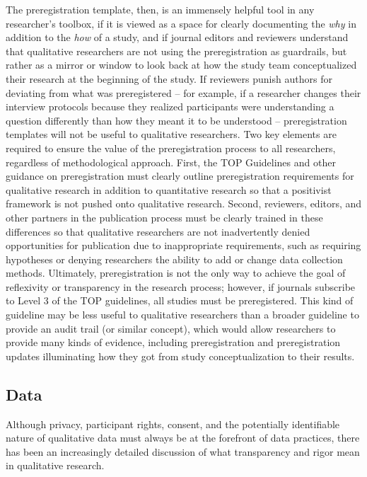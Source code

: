 \documentclass[authordate, meta]{jote-new-article}
\begin{document}
The preregistration template, then, is an immensely helpful tool in any researcher’s toolbox, if it is viewed as a space for clearly documenting the \emph{why }in addition to the \emph{how} of a study, and if journal editors and reviewers understand that qualitative researchers are not using the preregistration as guardrails, but rather as a mirror or window to look back at how the study team conceptualized their research at the beginning of the study. If reviewers punish authors for deviating from what was preregistered – for example, if a researcher changes their interview protocols because they realized participants were understanding a question differently than how they meant it to be understood – preregistration templates will not be useful to qualitative researchers. Two key elements are required to ensure the value of the preregistration process to all researchers, regardless of methodological approach. First, the TOP Guidelines and other guidance on preregistration must clearly outline preregistration requirements for qualitative research in addition to quantitative research so that a positivist framework is not pushed onto qualitative research. Second, reviewers, editors, and other partners in the publication process must be clearly trained in these differences so that qualitative researchers are not inadvertently denied opportunities for publication due to inappropriate requirements, such as requiring hypotheses or denying researchers the ability to add or change data collection methods. Ultimately, preregistration is not the only way to achieve the goal of reflexivity or transparency in the research process; however, if journals subscribe to Level 3 of the TOP guidelines, all studies must be preregistered. This kind of guideline may be less useful to qualitative researchers than a broader guideline to provide an audit trail (or similar concept), which would allow researchers to provide many kinds of evidence, including preregistration and preregistration updates \parencites{Corker2022} illuminating how they got from study conceptualization to their results.







\subsection{Data}



Although privacy, participant rights, consent, and the potentially identifiable nature of qualitative data must always be at the forefront of data practices, there has been an increasingly detailed discussion of what transparency and rigor mean in qualitative research.
\end{document}
